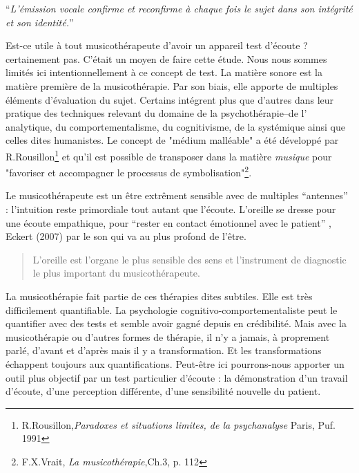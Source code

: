 \enquote{\emph{L'émission vocale confirme et reconfirme à chaque
fois le sujet dans son intégrité et son identité.}}%
\autocite[Tomatis en fait une description précise dans la troisième partie de
son livre, pp. 185--301]{tomatis:loreille}


        Est-ce utile à tout musicothérapeute d'avoir un appareil test d'écoute ? certainement pas. C'était un moyen de faire cette étude.
     Nous nous sommes  limités ici intentionnellement
     à ce concept de test.
 La matière sonore est la matière première de la  musicothérapie. 
 Par son biais, elle  apporte de multiples éléments d'évaluation du
 sujet. 
 Certains  intégrent plus que d'autres dans leur pratique des techniques relevant du domaine de la psychothérapie--de l' analytique, 
  du comportementalisme, du cognitivisme, de la  systémique ainsi que
  celles dites humanistes.  Le concept de "médium malléable" a été
  développé par  R.Rousillon\footnote{R.Rousillon,\textit{Paradoxes et situations limites,  
  		de la psychanalyse} Paris, Puf. 1991} 
  et qu'il est possible de transposer dans la matière \textit{musique} 
  pour "favoriser et accompagner le processus 
  de symbolisation"\footnote{F.X.Vrait, \textit{La musicothérapie},Ch.3, p. 112}.

 Le musicothérapeute est un être extrêment sensible avec de multiples
 ``antennes'' : l'intuition reste primordiale tout autant que  
 l'écoute. L'oreille se dresse pour une écoute empathique, pour ``rester en contact émotionnel  
 avec le patient'' , Eckert (2007) par le son qui va au plus profond de
 l'être.

 
\begin{quotation}
	L'oreille est l'organe le plus sensible des sens 
et l'instrument de diagnostic  le plus important du
musicothérapeute.\autocite{seminar_zuerich}
 	
\end{quotation}
La musicothérapie fait partie de ces thérapies dites subtiles. Elle
est très difficilement quantifiable. La
psychologie cognitivo-comportementaliste peut le quantifier avec des tests et semble avoir gagné depuis en crédibilité. Mais avec la musicothérapie ou d'autres formes de thérapie, il n'y a
jamais, à proprement parlé, d'avant et d'après mais il y a transformation.
Et les transformations échappent toujours aux quantifications. Peut-être
ici pourrons-nous apporter un outil plus objectif par un test particulier
d'écoute : la démonstration d'un travail d'écoute, d'une perception
différente, d'une sensibilité nouvelle du patient. 



